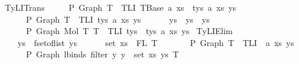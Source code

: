 \begin{isabellebody}
{\isacharbar}{\kern0pt}\ TyLITrans{\isacharcolon}{\kern0pt}\isanewline
\ \ \ \ {\isachardoublequoteopen}{\isasymGamma}\ {\isasymturnstile}{\isacharbraceleft}{\kern0pt}P{\isacharbraceright}{\kern0pt}\ Graph\ T{}\ {\isacharcolon}{\kern0pt}\ TLI\ {\isacharparenleft}{\kern0pt}{\isacharbraceleft}{\kern0pt}{\isacharhash}{\kern0pt}TBase\ a{}\ xs{}{\isacharhash}{\kern0pt}{\isacharbraceright}{\kern0pt}\ {\isacharplus}{\kern0pt}\ tys{}{\isacharparenright}{\kern0pt}\ a{}\ xs{}\ ys{}\ {\isacharequal}{\kern0pt}{\isacharequal}{\kern0pt}{\isachargreater}{\kern0pt}\isanewline
\ \ \ \ \ {\isasymGamma}\ {\isasymturnstile}{\isacharbraceleft}{\kern0pt}P{\isacharbraceright}{\kern0pt}\ Graph\ T{}\ {\isacharcolon}{\kern0pt}\ TLI\ tys{}\ a{}\ xs{}\ ys{}\ {\isacharequal}{\kern0pt}{\isacharequal}{\kern0pt}{\isachargreater}{\kern0pt}\isanewline
\ \ \ \ \ ys\ {\isacharequal}{\kern0pt}\ {\isacharparenleft}{\kern0pt}ys{}\ {\isacharbar}{\kern0pt}{\isasymunion}{\isacharbar}{\kern0pt}\ ys{}{\isacharparenright}{\kern0pt}\ {\isacharequal}{\kern0pt}{\isacharequal}{\kern0pt}{\isachargreater}{\kern0pt}\isanewline
\ \ \ \ \ {\isasymGamma}\ {\isasymturnstile}{\isacharbraceleft}{\kern0pt}P{\isacharbraceright}{\kern0pt}\ Graph\ {\isacharparenleft}{\kern0pt}Mol\ T{}\ T{}{\isacharparenright}{\kern0pt}\ {\isacharcolon}{\kern0pt}\ TLI\ {\isacharparenleft}{\kern0pt}tys{}\ {\isacharplus}{\kern0pt}\ tys{}{\isacharparenright}{\kern0pt}\ a{}\ xs{}\ ys{\isachardoublequoteclose}\isanewline
{\isacharbar}{\kern0pt}\ TyLIElim{}{\isacharcolon}{\kern0pt}\isanewline
\ \ \ \ {\isachardoublequoteopen}ys\ {\isacharequal}{\kern0pt}\ fset{\isacharunderscore}{\kern0pt}of{\isacharunderscore}{\kern0pt}list\ ys{\isacharprime}{\kern0pt}\ {\isacharequal}{\kern0pt}{\isacharequal}{\kern0pt}{\isachargreater}{\kern0pt}\isanewline
\ \ \ \ \ set\ xs\ {\isasymsubseteq}\ FL\ T\ {\isacharequal}{\kern0pt}{\isacharequal}{\kern0pt}{\isachargreater}{\kern0pt}\isanewline
\ \ \ \ \ {\isasymGamma}\ {\isasymturnstile}{\isacharbraceleft}{\kern0pt}P{\isacharbraceright}{\kern0pt}\ Graph\ T\ {\isacharcolon}{\kern0pt}\ TLI\ {}\ a\ xs\ ys\ {\isacharequal}{\kern0pt}{\isacharequal}{\kern0pt}{\isachargreater}{\kern0pt}\isanewline
\ \ \ \ \ {\isasymGamma}\ {\isasymturnstile}{\isacharbraceleft}{\kern0pt}P{\isacharbraceright}{\kern0pt}\ Graph\ {\isacharparenleft}{\kern0pt}lbinds\ {\isacharparenleft}{\kern0pt}filter\ {\isacharparenleft}{\kern0pt}{\isasymlambda}y{\isachardot}{\kern0pt}\ y\ {\isasymnotin}\ set\ xs{\isacharparenright}{\kern0pt}\ ys{\isacharprime}{\kern0pt}{\isacharparenright}{\kern0pt}\ T{\isacharparenright}{\kern0pt}\isanewline

\end{isabellebody}
